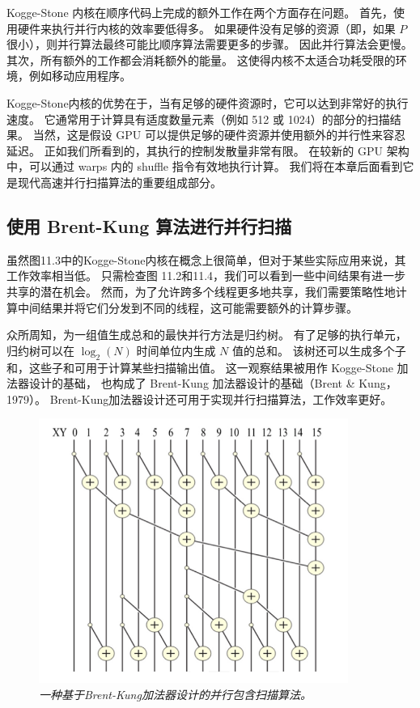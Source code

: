 Kogge-Stone 内核在顺序代码上完成的额外工作在两个方面存在问题。 首先，使用硬件来执行并行内核的效率要低得多。 
如果硬件没有足够的资源（即，如果 $P$ 很小），则并行算法最终可能比顺序算法需要更多的步骤。 因此并行算法会更慢。 
其次，所有额外的工作都会消耗额外的能量。 这使得内核不太适合功耗受限的环境，例如移动应用程序。

Kogge-Stone内核的优势在于，当有足够的硬件资源时，它可以达到非常好的执行速度。 
它通常用于计算具有适度数量元素（例如 512 或 1024）的部分的扫描结果。
当然，这是假设 GPU 可以提供足够的硬件资源并使用额外的并行性来容忍延迟。 正如我们所看到的，其执行的控制发散量非常有限。 
在较新的 GPU 架构中，可以通过 warps 内的 shuffle 指令有效地执行计算。 
我们将在本章后面看到它是现代高速并行扫描算法的重要组成部分。

\subsection{使用 Brent-Kung 算法进行并行扫描}
虽然图11.3中的Kogge-Stone内核在概念上很简单，但对于某些实际应用来说，其工作效率相当低。 
只需检查图 11.2和11.4，我们可以看到一些中间结果有进一步共享的潜在机会。 
然而，为了允许跨多个线程更多地共享，我们需要策略性地计算中间结果并将它们分发到不同的线程，这可能需要额外的计算步骤。

众所周知，为一组值生成总和的最快并行方法是归约树。 
有了足够的执行单元，归约树可以在 $\log_{2}(N)$ 时间单位内生成 $N$ 值的总和。 
该树还可以生成多个子和，这些子和可用于计算某些扫描输出值。 
这一观察结果被用作 Kogge-Stone 加法器设计的基础，
也构成了 Brent-Kung 加法器设计的基础（Brent \& Kung，1979）。 
Brent-Kung加法器设计还可用于实现并行扫描算法，工作效率更好。

\begin{figure}[H]
	\centering
	\includegraphics[width=0.9\textwidth]{figs/F11.5.png}
	\caption{\textit{一种基于Brent-Kung加法器设计的并行包含扫描算法。}}
\end{figure}

